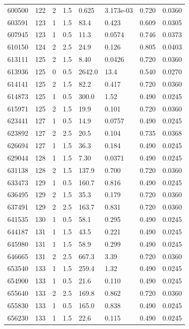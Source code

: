 \documentclass[preview]{standalone}
\begin{document}
{{{{{{\begin{tabular}{L{1.2cm}C{1.2cm} C{0.3cm}C{0.5cm} C{1.4cm}C{1.4cm} C{1.4cm}C{1.4cm}}
  600500  &   122  & 2     & 1.5 &  0.625  & 3.173e-03  & 0.720 &  0.0360   \\ 
  603591  &   123  & 1     & 1.5 &  83.4  & 0.423  & 0.609 &  0.0305   \\ 
  607945  &   123  & 1     & 0.5 &  11.3  & 0.0574  & 0.746 &  0.0373   \\ 
  610150  &   124  & 2     & 2.5 &  24.9  & 0.126  & 0.805 &  0.0403   \\ 
  613111  &   125  & 2     & 1.5 &  8.40  & 0.0426  & 0.720 &  0.0360   \\ 
  613936  &   125  & 0     & 0.5 &  2642.0  & 13.4  & 0.540 &  0.0270   \\ 
  614141  &   125  & 2     & 1.5 &  82.2  & 0.417  & 0.720 &  0.0360   \\ 
  614873  &   125  & 1     & 0.5 &  300.0  & 1.52  & 0.490 &  0.0245   \\ 
  615971  &   125  & 2     & 1.5 &  19.9  & 0.101  & 0.720 &  0.0360   \\ 
  623441  &   127  & 1     & 0.5 &  14.9  & 0.0757  & 0.490 &  0.0245   \\ 
  623892  &   127  & 2     & 2.5 &  20.5  & 0.104  & 0.735 &  0.0368   \\ 
  626694  &   127  & 1     & 1.5 &  36.3  & 0.184  & 0.490 &  0.0245   \\ 
  629044  &   128  & 1     & 1.5 &  7.30  & 0.0371  & 0.490 &  0.0245   \\ 
  631138  &   128  & 2     & 1.5 &  137.9  & 0.700  & 0.720 &  0.0360   \\ 
  633473  &   129  & 1     & 0.5 &  160.7  & 0.816  & 0.490 &  0.0245   \\ 
  636495  &   129  & 2     & 1.5 &  35.3  & 0.179  & 0.720 &  0.0360   \\ 
  637491  &   129  & 2     & 2.5 &  163.7  & 0.831  & 0.720 &  0.0360   \\ 
  641535  &   130  & 1     & 0.5 &  58.1  & 0.295  & 0.490 &  0.0245   \\ 
  644187  &   131  & 1     & 1.5 &  43.5  & 0.221  & 0.490 &  0.0245   \\ 
  645980  &   131  & 1     & 1.5 &  58.9  & 0.299  & 0.490 &  0.0245   \\ 
  646665  &   131  & 2     & 2.5 &  667.3  & 3.39  & 0.720 &  0.0360   \\ 
  653540  &   133  & 1     & 1.5 &  259.4  & 1.32  & 0.490 &  0.0245   \\ 
  654900  &   133  & 1     & 0.5 &  21.6  & 0.110  & 0.490 &  0.0245   \\ 
  655640  &   133  & 2     & 2.5 &  169.8  & 0.862  & 0.720 &  0.0360   \\ 
  655830  &   133  & 1     & 0.5 &  165.0  & 0.838  & 0.490 &  0.0245   \\ 
  656230  &   133  & 1     & 1.5 &  22.6  & 0.115  & 0.490 &  0.0245   \\ 
\hline 
\end{tabular} 

}}}}}}
\end{document}
